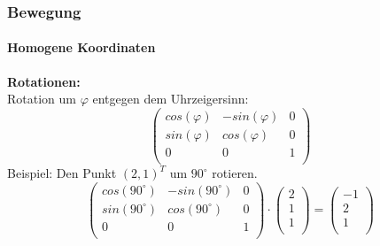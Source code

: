 \documentclass[dvips,12pt,xcolor=table]{beamer}
\begin{document}
\begin{frame}
\frametitle{Bewegung}
\framesubtitle{Homogene Koordinaten}
\textbf{Rotationen: \\}
Rotation um $\varphi$ entgegen dem Uhrzeigersinn:
\begin{equation}
 \left(\begin{array}{ccc}
  cos(\varphi) & -sin(\varphi) & 0 \\
  sin(\varphi) & cos(\varphi) & 0 \\
  0 & 0 & 1 \\
 \end{array}\right)
\end{equation}
\hspace{2mm}
Beispiel: Den Punkt $(2, 1)^{T}$ um $90^{\circ}$ rotieren.
\begin{equation}
 \left(\begin{array}{ccc}
  cos(90^{\circ}) & -sin(90^{\circ}) & 0 \\
  sin(90^{\circ}) & cos(90^{\circ}) & 0 \\
  0 & 0 & 1 \\
 \end{array}\right)
 \cdot
 \left(\begin{array}{ccc}
  2 \\
  1 \\
  1 \\
 \end{array}\right)
 =
 \left(\begin{array}{ccc}
  -1 \\
  2 \\
  1 \\
 \end{array}\right)
\end{equation}
\end{frame}
\end{document}
